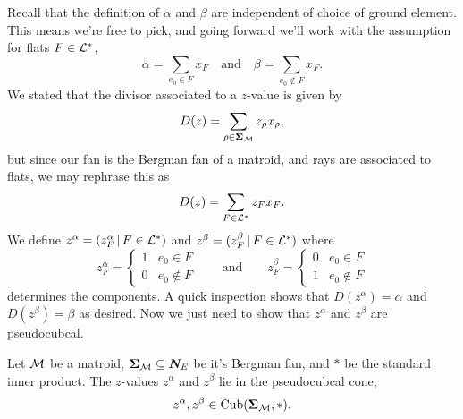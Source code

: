 \documentclass[12pt,oneside]{../../sfsuthesis}
\begin{document}
Recall that the definition of \( \alpha \) and \( \beta \) are independent of choice of ground element.
This means we're free to pick, and going forward we'll work with the assumption for flats \( F \in \mathcal{L}^\ast \),
\[
    \alpha = \sum_{e_0 \in F} x_F \quad \text{and} \quad \beta = \sum_{e_0 \notin F} x_F.
\]
We stated that the divisor associated to a \( z \)-value is given by
\[
    D(z) = \sum_{\rho \in \bm{\Sigma}_{\mathcal{M}}} z_\rho x_\rho,
\]
but since our fan is the Bergman fan of a matroid, and rays are associated to flats, we may rephrase this as
\[
    D(z) = \sum_{F \in \mathcal{L}^\ast} z_F x_F.
\]
We define \( z^\alpha = (z^\alpha_F \, | \, F \in \mathcal{L}^\ast) \) and \( z^\beta = (z^\beta_F \, | \, F \in \mathcal{L}^\ast) \) where
\[
    z^\alpha_F = \begin{cases}
        1 & e_0 \in F    \\
        0 & e_0 \notin F
    \end{cases}
    \quad \quad \text{and} \quad \quad
    z^\beta_F= \begin{cases}
        0 & e_0 \in F    \\
        1 & e_0 \notin F
    \end{cases}
\]
determines the components.
A quick inspection shows that \( D(z^\alpha) = \alpha \) and \( D(z^\beta) = \beta \) as desired.
Now we just need to show that \( z^\alpha \) and \( z^\beta \) are pseudocubcal.
\begin{proposition}
    Let \( \mathcal{M} \) be a matroid, \( \bm{\Sigma}_{\mathcal{M}} \subseteq \bm{N}_E \) be it's Bergman fan, and \( \ast \) be the standard inner product.
    The \( z \)-values \(  z^\alpha \) and \( z^\beta \) lie in the pseudocubcal cone,
    \[
        z^\alpha, z^\beta \in  \operatorname{\overline{Cub}}(\bm{\Sigma}_{\mathcal{M}}, \ast).
    \]
\end{proposition}
\end{document}
